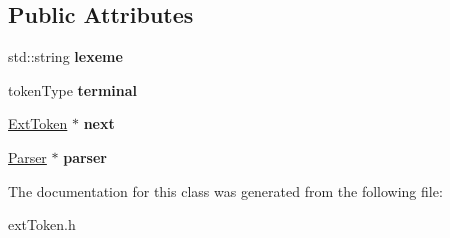 \subsection*{Public Attributes}
\begin{DoxyCompactItemize}
\item 
\hypertarget{class_ext_token_a5af1643a542ef7ee8ca0f82706383ae3}{}std\+::string {\bfseries lexeme}\label{class_ext_token_a5af1643a542ef7ee8ca0f82706383ae3}

\item 
\hypertarget{class_ext_token_abbdaef42b65403cdc0247839ef95c875}{}token\+Type {\bfseries terminal}\label{class_ext_token_abbdaef42b65403cdc0247839ef95c875}

\item 
\hypertarget{class_ext_token_aa02995a897183b2a6ef758e541534e46}{}\hyperlink{class_ext_token}{Ext\+Token} $\ast$ {\bfseries next}\label{class_ext_token_aa02995a897183b2a6ef758e541534e46}

\item 
\hypertarget{class_ext_token_af70d22156d5f8e855a8b0d92a82706ba}{}\hyperlink{class_parser}{Parser} $\ast$ {\bfseries parser}\label{class_ext_token_af70d22156d5f8e855a8b0d92a82706ba}

\end{DoxyCompactItemize}


The documentation for this class was generated from the following file\+:\begin{DoxyCompactItemize}
\item 
ext\+Token.\+h\end{DoxyCompactItemize}
